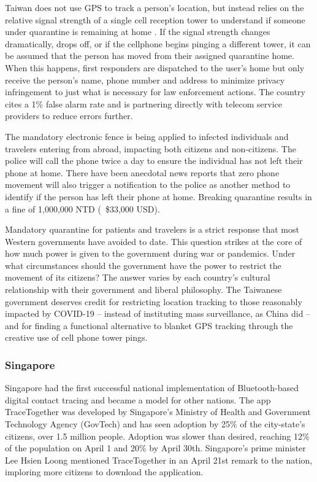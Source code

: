 \documentclass{article}
\begin{document}
Taiwan does not use GPS to track a person’s location, but instead relies on the relative signal strength of a single cell reception tower to understand if someone under quarantine is remaining at home \cite{TaiwanDigitalFence}. If the signal strength changes dramatically, drops off, or if the cellphone begins pinging a different tower, it can be assumed that the person has moved from their assigned quarantine home. When this happens, first responders are dispatched to the user’s home but only receive the person’s name, phone number and address to minimize privacy infringement to just what is necessary for law enforcement actions. The country cites a 1\% false alarm rate\cite{TaiwanTrackingSystem} and is partnering directly with telecom service providers to reduce errors further.

The mandatory electronic fence is being applied to infected individuals and travelers entering from abroad, impacting both citizens and non-citizens. The police will call the phone twice a day to ensure the individual has not left their phone at home. There have been anecdotal news reports that zero phone movement will also trigger a notification to the police as another method to identify if the person has left their phone at home. Breaking quarantine results in a fine of 1,000,000 NTD (~\$33,000 USD)\cite{TaiwanDigitalFence2}.

Mandatory quarantine for patients and travelers is a strict response that most Western governments have avoided to date. This question strikes at the core of how much power is given to the government during war or pandemics. Under what circumstances should the government have the power to restrict the movement of its citizens? The answer varies by each country’s cultural relationship with their government and liberal philosophy. The Taiwanese government deserves credit for restricting location tracking to those reasonably impacted by COVID-19 – instead of instituting mass surveillance, as China did – and for finding a functional alternative to blanket GPS tracking through the creative use of cell phone tower pings.

\subsubsection{Singapore}
Singapore had the first successful national implementation of Bluetooth-based digital contact tracing and became a model for other nations. The app TraceTogether was developed by Singapore’s Ministry of Health and Government Technology Agency (GovTech) and has seen adoption by 25\% of the city-state’s citizens, over 1.5 million people\cite{TraceTogether}. Adoption was slower than desired, reaching 12\% of the population on April 1 and 20\% by April 30th\cite{USLearn}. Singapore’s prime minister Lee Hsien Loong mentioned TraceTogether in an April 21st remark to the nation, imploring more citizens to download the application\cite{SingaporeAprilSituation}. 
\end{document}
